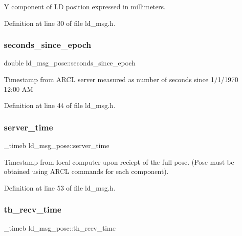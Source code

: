 Y component of LD position expressed in millimeters. 

Definition at line 30 of file ld\+\_\+msg.\+h.

\mbox{\label{structld__msg__pose_ad26937c8008680739f207cbc0d76c003}} 
\subsubsection{\texorpdfstring{seconds\+\_\+since\+\_\+epoch}{seconds\_since\_epoch}}
{\footnotesize\ttfamily double ld\+\_\+msg\+\_\+pose\+::seconds\+\_\+since\+\_\+epoch}

Timestamp from A\+R\+CL server measured as number of seconds since 1/1/1970 12\+:00 AM 

Definition at line 44 of file ld\+\_\+msg.\+h.

\mbox{\label{structld__msg__pose_a812b4a4a731bc33b0a356b1340610e28}} 
\subsubsection{\texorpdfstring{server\+\_\+time}{server\_time}}
{\footnotesize\ttfamily \+\_\+timeb ld\+\_\+msg\+\_\+pose\+::server\+\_\+time}

Timestamp from local computer upon reciept of the full pose. (Pose must be obtained using A\+R\+CL commands for each component). 

Definition at line 53 of file ld\+\_\+msg.\+h.

\mbox{\label{structld__msg__pose_acf025c0af4d2a3195c42d9ca133d3e74}} 
\subsubsection{\texorpdfstring{th\+\_\+recv\+\_\+time}{th\_recv\_time}}
{\footnotesize\ttfamily \+\_\+timeb ld\+\_\+msg\+\_\+pose\+::th\+\_\+recv\+\_\+time}

